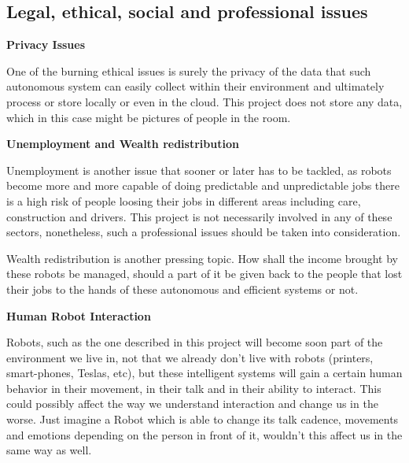 \begin{appendices}
\chapter{Legal, ethical, social and professional issues}

\textbf{Privacy Issues}

One of the burning ethical issues is surely the privacy of the data that such autonomous system can easily collect within their environment and ultimately process or store locally or even in the cloud. This project does not store any data, which in this case might be pictures of people in the room.

\textbf{Unemployment and Wealth redistribution}

Unemployment is another issue that sooner or later has to be tackled, as robots become more and more capable of doing predictable and unpredictable jobs there is a high risk of people loosing their jobs in different areas including care, construction and drivers. This project is not necessarily involved in any of these sectors, nonetheless, such a professional issues should be taken into consideration. 

Wealth redistribution is another pressing topic. How shall the income brought by these robots be managed, should a part of it be given back to the people that lost their jobs to the hands of these autonomous and efficient systems or not.

\textbf{Human Robot Interaction}

Robots, such as the one described in this project will become soon part of the environment we live in, not that we already don't live with robots (printers, smart-phones, Teslas, etc), but these intelligent systems will gain a certain human behavior in their movement, in their talk and in their ability to interact. This could possibly affect the way we understand interaction and change us in the worse. Just imagine a Robot which is able to change its talk cadence, movements and emotions depending on the person in front of it, wouldn't this affect us in the same way as well.

\end{appendices}